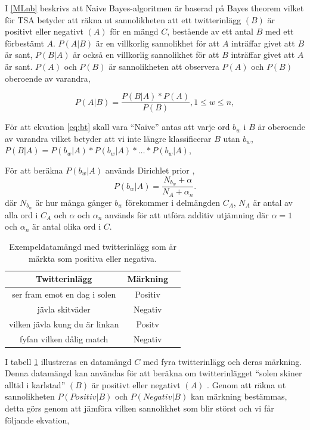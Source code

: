 \documentclass{kaumasters} %
\begin{document}
I \ref{MLnb} beskrivs att Naive Bayes-algoritmen är baserad på Bayes theorem \cite{wiki:009} vilket för TSA betyder att räkna ut sannolikheten att ett twitterinlägg $(B)$ är positivt eller negativt $(A)$ för en mängd $C$, bestående av ett antal $B$ med ett förbestämt $A$. $P(A | B)$ är en villkorlig sannolikhet för att $A$ inträffar givet att $B$ är sant, $P(B | A)$ är också en villkorlig sannolikhet för att $B$ inträffar givet att $A$ är sant. $P(A)$ och $P(B)$ är sannolikheten att observera $P(A)$ och $P(B)$ oberoende av varandra,

\begin{equation}\label{eq:bt}
P(A|B) = \frac{P(B|A) * P(A)}{P(B)}, 1 \leq w \leq n,
\end{equation}

För att ekvation \ref{eq:bt} skall vara “Naive” antas att varje ord $b_w$ i $B$ är oberoende av varandra vilket betyder att vi inte längre klassificerar $B$ utan $b_w$, $P(B|A) = P(b_{w}|A) * P(b_{w}|A) * … * P(b_{w}|A)$,

För att beräkna $P(b_w|A)$ används Dirichlet prior \cite{wiki:012, nb:007}, 
\begin{equation}\label{eq:slut}
P(b_w|A)= \frac{N_{b_w} + \alpha}{N_A + \alpha_n}.
\end{equation}
där $N_{b_w}$ är hur många gånger $b_w$ förekommer i delmängden $C_A$, 
$N_A$ är antal av alla ord i $C_A$ och $\alpha$ och $\alpha_n$ används för att utföra additiv utjämning \cite{wiki:013} där $\alpha = 1$ och $\alpha_n$ är antal olika ord i $C$.

\begin{table}[H]
\centering
\caption{Exempeldatamängd med twitterinlägg som är märkta som positiva eller negativa.}
\label{tab:dataset}
    \begin{tabular}{ccc}
    \toprule
    \textbf{Twitterinlägg} & \textbf{Märkning} \\
    \midrule
    ser fram emot en dag i solen & Positiv \\
    jävla skitväder & Negativ \\
    vilken jävla kung du är linkan & Positv \\
    fyfan vilken dålig match & Negativ \\
    \bottomrule
\end{tabular}
\end{table}

I tabell \ref{tab:dataset} illustreras en datamängd $C$ med fyra twitterinlägg och deras märkning. Denna datamängd kan användas för att beräkna om twitterinlägget “solen skiner alltid i karlstad” $(B)$ är positivt eller negativt $(A)$ . Genom att räkna ut sannolikheten $P(Positiv|B)$ och $P(Negativ|B)$ kan märkning bestämmas, detta görs genom att jämföra vilken sannolikhet som blir störst och vi får följande ekvation,
\end{document}
